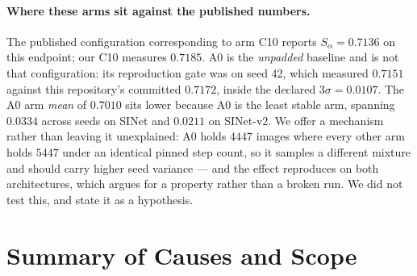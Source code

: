 \documentclass{article} %
\begin{document}
\paragraph{Where these arms sit against the published numbers.} The published configuration
corresponding to arm C10 reports $S_\alpha = 0.7136$ on this endpoint; our C10 measures $0.7185$. A0
is the \emph{unpadded} baseline and is not that configuration: its reproduction gate was on seed 42, which measured $0.7151$ against this repository's committed $0.7172$, inside the declared
$3\sigma = 0.0107$. The A0 arm \emph{mean} of $0.7010$ sits lower because A0 is the least stable arm,
spanning $0.0334$ across seeds on SINet and $0.0211$ on SINet-v2. We offer a mechanism rather than
leaving it unexplained: A0 holds $4447$ images where every other arm holds $5447$ under an identical
pinned step count, so it samples a different mixture and should carry higher seed variance --- and the
effect reproduces on both architectures, which argues for a property rather than a broken run. We did
not test this, and state it as a hypothesis.


\section{Summary of Causes and Scope}
\label{app:causes}
\end{document}
